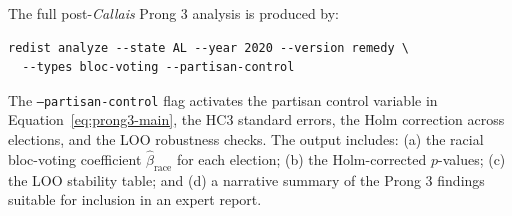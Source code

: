 The full post-\textit{Callais} Prong 3 analysis is produced by:
\begin{verbatim}
redist analyze --state AL --year 2020 --version remedy \
  --types bloc-voting --partisan-control
\end{verbatim}
The \texttt{--partisan-control} flag activates the partisan control variable
in Equation~\ref{eq:prong3-main}, the HC3 standard errors, the Holm correction
across elections, and the LOO robustness checks.  The output includes: (a) the
racial bloc-voting coefficient $\hat{\beta}_{\text{race}}$ for each election;
(b) the Holm-corrected $p$-values; (c) the LOO stability table; and (d) a
narrative summary of the Prong 3 findings suitable for inclusion in an expert
report.

